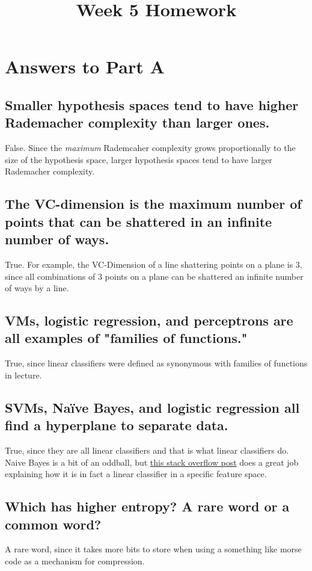 \documentclass{article}
\title{Week 5 Homework}
\begin{document}
 

\section{Answers to Part A}
\subsection{Smaller hypothesis spaces tend to have higher Rademacher complexity than larger ones.}
False. Since the \textit{maximum} Rademcaher complexity grows proportionally to the size of the hypothesis space, larger hypothesis spaces tend to have larger Rademacher complexity. 

\subsection{The VC-dimension is the maximum number of points that can be shattered in an infinite number of ways.}
True. For example, the VC-Dimension of a line shattering points on a plane is 3, since all combinations of 3 points on a plane can be shattered an infinite number of ways by a line. 

\subsection{VMs, logistic regression, and perceptrons are all examples of "families of functions."}
True, since linear classifiers were defined as synonymous with families of functions in lecture. 

\subsection{SVMs, Naïve Bayes, and logistic regression all find a hyperplane to separate data.}
True, since they are all linear classifiers and that is what linear classifiers do. Naive Bayes is a bit of an oddball, but \href{http://stats.stackexchange.com/questions/142215/how-is-naive-bayes-a-linear-classifier}{this stack overflow post} does a great job explaining how it is in fact a linear classifier in a specific feature space. 

\subsection{Which has higher entropy? A rare word or a common word?}
A rare word, since it takes more bits to store when using a something like morse code as a mechanism for compression. 
\end{document}
